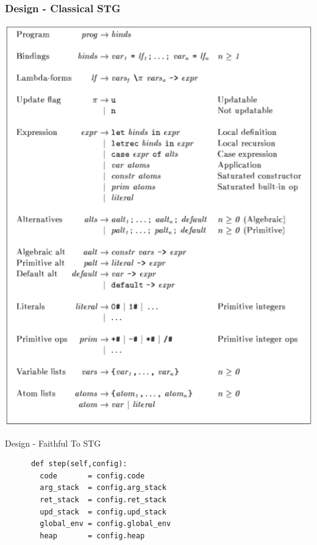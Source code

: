 \documentclass[xetex,serif,mathserif]{beamer}
\newenvironment{slide}[1]{\begin{frame}\frametitle{#1}}{\end{frame}}
\begin{document}
\begin{slide}{Design - Classical STG}
  \begin{center}
  \includegraphics[scale=0.3]{stg-def}
  \end{center}
\end{slide}

\begin{frame}[fragile]{Design - Faithful To STG}
  \begin{center}
    \begin{verbatim}
      def step(self,config):
        code       = config.code
        arg_stack  = config.arg_stack
        ret_stack  = config.ret_stack
        upd_stack  = config.upd_stack
        global_env = config.global_env
        heap       = config.heap
    \end{verbatim}
  \end{center}
\end{frame}
\end{document}
